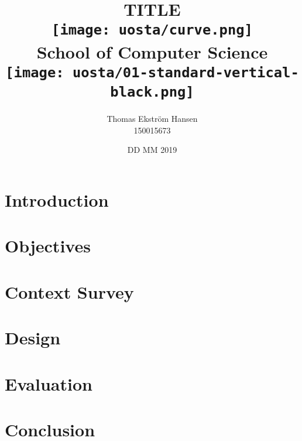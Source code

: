 \documentclass[12pt]{report}
\title{
    {TITLE}\\
    \vspace{2cm}
    {\texttt{[image: uosta/curve.png]}}\\
    {\large School of Computer Science}\\
    \vspace{-0.8cm}
    {\texttt{[image: uosta/01-standard-vertical-black.png]}}\\
    \vspace{-2cm}
}
\author{
    {Thomas Ekstr{\" o}m Hansen}\\
    {150015673}
}
\date{DD MM 2019}
\begin{document}
    \maketitle
    
    \tableofcontents
    
    \chapter{Introduction}
    
    
    \chapter{Objectives}
    
    
    \chapter{Context Survey}
    
        
    \chapter{Design}
    
    
    \chapter{Evaluation}
    
        
    \chapter{Conclusion}
    
\end{document}
